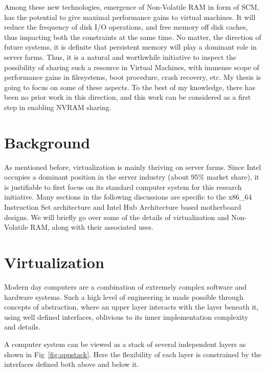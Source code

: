 Among these new technologies, emergence of Non-Volatile RAM in form of SCM, has the potential to give maximal performance gains to virtual machines. It will reduce the frequency of disk I/O operations, and free memory off disk caches, thus impacting both the constraints at the same time. No matter, the direction of future systems, it is definite that persistent memory will play a dominant role in server farms. Thus, it is a natural and worthwhile initiative to inspect the possibility of sharing such a resource in Virtual Machines, with immense scope of performance gains in filesystems, boot procedure, crash recovery, etc. My thesis is going to focus on some of these aspects. To the best of my knowledge, there has been no prior work in this direction, and this work can be considered as a first step in enabling NVRAM sharing. 
\section{Background}

As mentioned before, virtualization is mainly thriving on server farms. Since Intel occupies a dominant position in the server industry (about 95\% market share), it is justifiable to first focus on its standard computer system for this research initiative. Many sections in the following discussions are specific to the x86\_64 Instruction Set architecture and Intel Hub Architecture based motherboard designs. We will briefly go over some of the details of virtualization and Non-Volatile RAM, along with their associated uses. 

\section{Virtualization}
Modern day computers are a combination of extremely complex software and hardware systems. Such a high level of engineering is made possible through concepts of abstraction, where an upper layer interacts with the layer beneath it, using well defined interfaces, oblivious to its inner implementation complexity and details.

A computer system can be viewed as a stack of several independent layers as shown in Fig~\ref{fig:appstack}. Here the flexibility of each layer is constrained by the interfaces defined both above and below it. 

\setlength{\belowcaptionskip}{-10pt}


